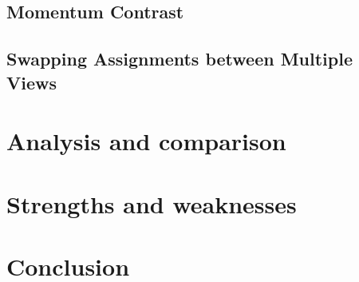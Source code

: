 \documentclass[12pt]{article}
\begin{document}
	\subsection*{Momentum Contrast}
	
	
	\subsection*{Swapping Assignments between Multiple Views}
	
	
	
	\section{Analysis and comparison}
	
	
	
	\section{Strengths and weaknesses}
	
	
	\section{Conclusion}
	
	
	\newpage
	
	
	

	
	
	
\end{document}
